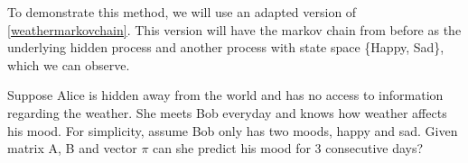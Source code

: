  To demonstrate this method, we will use an adapted version of \ref{weathermarkovchain}. This version will have the markov chain from before as the underlying hidden process and another process with state space \{Happy, Sad\}, which we can observe.

 \begin{example}
    \label{motivationhmm}
    Suppose Alice is hidden away from the world and has no access to information regarding the weather. She meets Bob everyday and knows how weather affects his mood.
    For simplicity, assume Bob only has two moods, happy and sad. Given matrix A, B and vector $\pi$ can she predict his mood for 3 consecutive days?
    \begin{figure}
        \centering
\end{figure}
\end{example}

